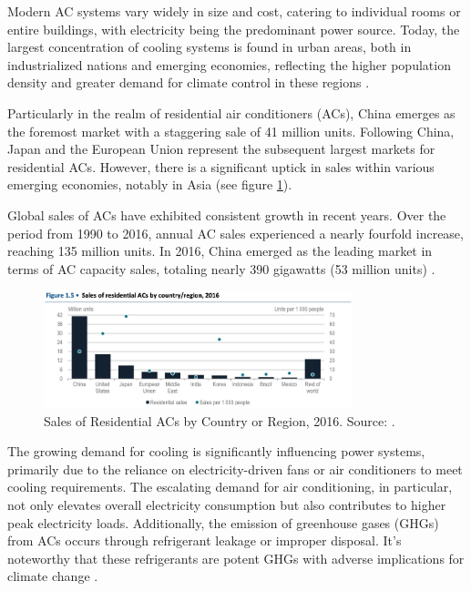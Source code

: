 Modern AC systems vary widely in size and cost, catering to individual rooms or entire buildings, with electricity being the predominant power source. Today, the largest concentration of cooling systems is found in urban areas, both in industrialized nations and emerging economies, reflecting the higher population density and greater demand for climate control in these regions \cite{international_energy_agency_future_2018}. 

Particularly in the realm of residential air conditioners (ACs), China emerges as the foremost market with a staggering sale of 41 million units. Following China, Japan and the European Union represent the subsequent largest markets for residential ACs. However, there is a significant uptick in sales within various emerging economies, notably in Asia (see figure \ref{fig:sales_acs}).

Global sales of ACs have exhibited consistent growth in recent years. Over the period from 1990 to 2016, annual AC sales experienced a nearly fourfold increase, reaching 135 million units. In 2016, China emerged as the leading market in terms of AC capacity sales, totaling nearly 390 gigawatts (53 million units) \cite{international_energy_agency_future_2018}. %

\begin{figure}
  \centering
  \includegraphics[width=0.8\textwidth]{Chapters/Figures/Sales of Residential ACs by Country or Region, 2016.jpg}
  \caption[Sales of Residential ACs by Country or Region, 2016]{Sales of Residential ACs by Country or Region, 2016. Source: \cite{international_energy_agency_future_2018}.}
  \label{fig:sales_acs}
\end{figure}

The growing demand for cooling is significantly influencing power systems, primarily due to the reliance on electricity-driven fans or air conditioners to meet cooling requirements. The escalating demand for air conditioning, in particular, not only elevates overall electricity consumption but also contributes to higher peak electricity loads. Additionally, the emission of greenhouse gases (GHGs) from ACs occurs through refrigerant leakage or improper disposal. It's noteworthy that these refrigerants are potent GHGs with adverse implications for climate change \cite{international_energy_agency_future_2018}. %

